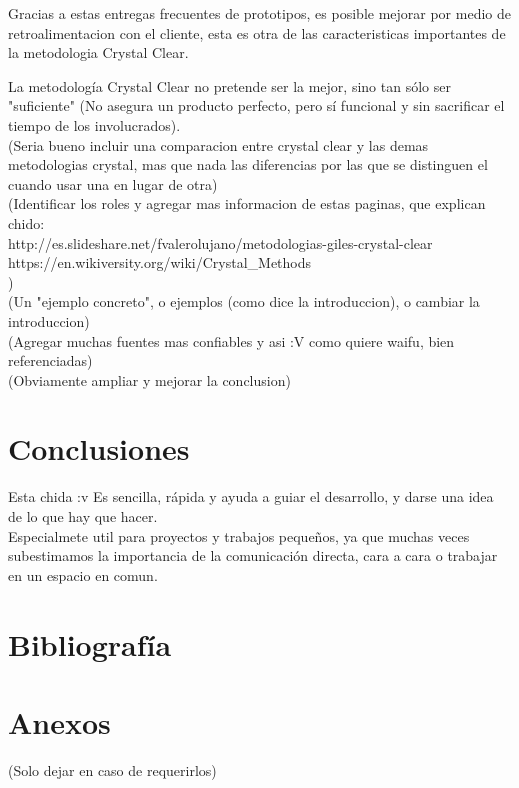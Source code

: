 \documentclass[12pt,a4paper]{article}
\begin{document}
	Gracias a estas entregas frecuentes de prototipos, es posible mejorar por medio de retroalimentacion con el cliente, esta es otra de las caracteristicas importantes de la metodologia Crystal Clear.
	
	La metodolog\'ia Crystal Clear no pretende ser la mejor, sino tan s\'olo ser "suficiente" (No asegura un producto perfecto, pero sí funcional y sin sacrificar el tiempo de los involucrados).\\
	
	(Seria bueno incluir una comparacion entre crystal clear y las demas metodologias crystal, mas que nada las diferencias por las que se distinguen el cuando usar una en lugar de otra)\\
	
	(Identificar los roles y agregar mas informacion de estas paginas, que explican chido:\\
	http://es.slideshare.net/fvalerolujano/metodologias-giles-crystal-clear \\
	https://en.wikiversity.org/wiki/Crystal\_Methods \\
	)\\
	
	(Un "ejemplo concreto", o ejemplos (como dice la introduccion), o cambiar la introduccion)\\
	
	(Agregar muchas fuentes mas confiables y asi :V como quiere waifu, bien referenciadas)\\
	
	(Obviamente ampliar y mejorar la conclusion)\\
	
	\section{Conclusiones}
	Esta chida :v Es sencilla, rápida y ayuda a guiar el desarrollo, y darse una idea de lo que hay que hacer.\\
	Especialmete util para proyectos y trabajos pequeños, ya que muchas veces subestimamos la importancia de la comunicación directa, cara a cara o trabajar en un espacio en comun.\\
	
	\section{Bibliografía}
	
	\section{Anexos}
	(Solo dejar en caso de requerirlos)
\end{document}
